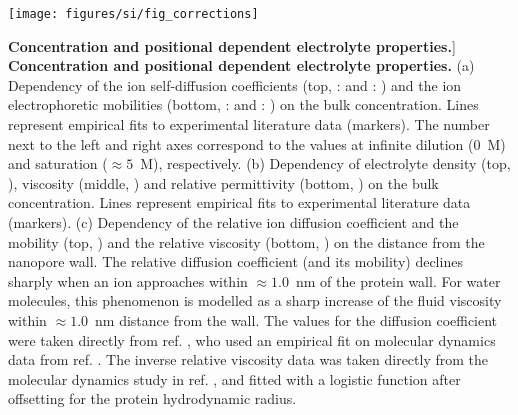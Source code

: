 
\begin{figure*}[b]

\centering

\texttt{[image: figures/si/fig\_corrections]}

\caption
[\textbf{Concentration and positional dependent electrolyte properties.}]
{
\textbf{Concentration and positional dependent electrolyte properties.}
(a)
Dependency of the ion self-diffusion coefficients (top, :  and : 
) and the ion electrophoretic mobilities (bottom, : 
 and : ) on the bulk  
concentration. Lines represent empirical fits to experimental literature data (markers). The number next to 
the left and right axes correspond to the values at infinite dilution ($0$~M) and saturation ($\approx5$~M), 
respectively.
(b)
Dependency of electrolyte density (top, ), viscosity (middle, 
) and relative permittivity (bottom, ) on the 
bulk  concentration. Lines represent empirical fits to experimental literature data (markers).
(c)
Dependency of the relative ion diffusion coefficient and the mobility (top, ) 
and the relative viscosity (bottom, ) on the distance from the nanopore wall. 
The relative diffusion coefficient (and its mobility) declines sharply when an ion approaches within 
$\approx1.0$~nm of the protein wall. For water molecules, this phenomenon is modelled as a sharp increase of 
the fluid viscosity within $\approx1.0$~nm distance from the wall. The values for the diffusion coefficient 
were taken directly from ref. , who used an empirical fit on molecular dynamics data 
from ref. . The inverse relative viscosity data was taken directly from the molecular 
dynamics study in ref. , and fitted with a logistic function after offsetting for the 
protein hydrodynamic radius.
}

\label{fig:corrections}

\end{figure*}

